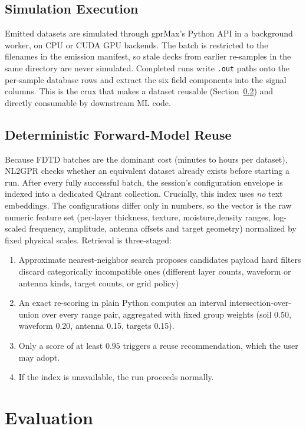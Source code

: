 \documentclass[journal]{IEEEtran}
\begin{document}
\subsection{Simulation Execution}

Emitted datasets are simulated through gprMax's Python API in a background worker, on CPU or CUDA GPU backends. The batch is restricted to the filenames in the emission manifest, so stale decks from earlier re-samples in the same directory are never simulated. Completed runs write \texttt{.out} paths onto the per-sample database rows and extract the six field components into the signal columns. This is the crux that makes a dataset reusable (Section~\ref{sec:reuse}) and directly consumable by downstream ML code.

\subsection{Deterministic Forward-Model Reuse}
\label{sec:reuse}

Because FDTD batches are the dominant cost (minutes to hours per dataset), NL2GPR checks whether an equivalent dataset already exists before starting a run. After every fully successful batch, the session's configuration envelope is indexed into a dedicated Qdrant collection. Crucially, this index uses \emph{no} text embeddings. The configurations differ only in numbers, so the vector is the raw numeric feature set (per-layer thickness, texture, moisture,density ranges, log-scaled frequency, amplitude, antenna offsets and target geometry) normalized by fixed physical scales. Retrieval is three-staged: 
\begin{enumerate}
    \item Approximate nearest-neighbor search proposes candidates payload hard filters discard categorically incompatible ones (different layer counts, waveform or antenna kinds, target counts, or grid policy)
    \item An exact re-scoring in plain Python computes an interval intersection-over-union over every range pair, aggregated with fixed group weights (soil 0.50, waveform 0.20, antenna 0.15, targets 0.15).
    \item Only a score of at least $0.95$ triggers a reuse recommendation, which the user may adopt.
    \item If the index is unavailable, the run proceeds normally.
\end{enumerate}


\section{Evaluation}
\label{sec:evaluation}
\end{document}
